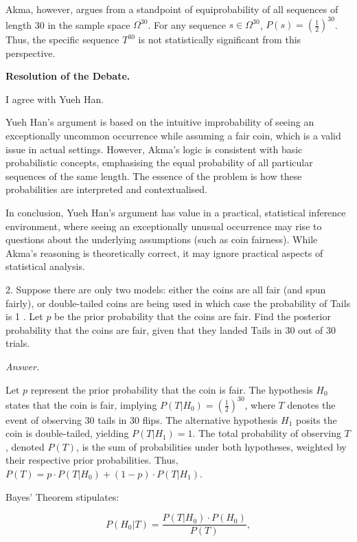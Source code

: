 \documentclass[12pt]{article}
\begin{document}
Akma, however, argues from a standpoint of equiprobability of all sequences of length 30 in the sample space \( \Omega^{30} \). For any sequence \( s \in \Omega^{30} \), \( P(s) = \left(\frac{1}{2}\right)^{30} \). Thus, the specific sequence \( T^{30} \) is not statistically significant from this perspective.

\newpage
\textbf{Resolution of the Debate.}

I agree with Yueh Han.

Yueh Han's argument is based on the intuitive improbability of seeing an exceptionally uncommon occurrence while assuming a fair coin, which is a valid issue in actual settings. However, Akma's logic is consistent with basic probabilistic concepts, emphasising the equal probability of all particular sequences of the same length. The essence of the problem is how these probabilities are interpreted and contextualised.

In conclusion, Yueh Han's argument has value in a practical, statistical inference environment, where seeing an exceptionally unusual occurrence may rise to questions about the underlying assumptions (such as coin fairness). While Akma's reasoning is theoretically correct, it may ignore practical aspects of statistical analysis.


\begin{q}
2. Suppose there are only two models: either the coins are all fair (and spun fairly), or double-tailed coins are being used in which case the probability of Tails is 1 . Let \(p\) be the prior probability that the coins are fair. Find the posterior probability that the coins are fair, given that they landed Tails in 30 out of 30 trials.
\end{q}

\textit{Answer.}

Let \( p \) represent the prior probability that the coin is fair. The hypothesis \( H_0 \) states that the coin is fair, implying \( P(T | H_0) = \left(\frac{1}{2}\right)^{30} \), where \( T \) denotes the event of observing 30 tails in 30 flips. The alternative hypothesis \( H_1 \) posits the coin is double-tailed, yielding \( P(T | H_1) = 1 \). The total probability of observing \( T \), denoted \( P(T) \), is the sum of probabilities under both hypotheses, weighted by their respective prior probabilities. Thus, \( P(T) = p \cdot P(T | H_0) + (1 - p) \cdot P(T | H_1) \).

Bayes' Theorem stipulates:

\[
P(H_0 | T) = \frac{P(T | H_0) \cdot P(H_0)}{P(T)},
\]
\end{document}
